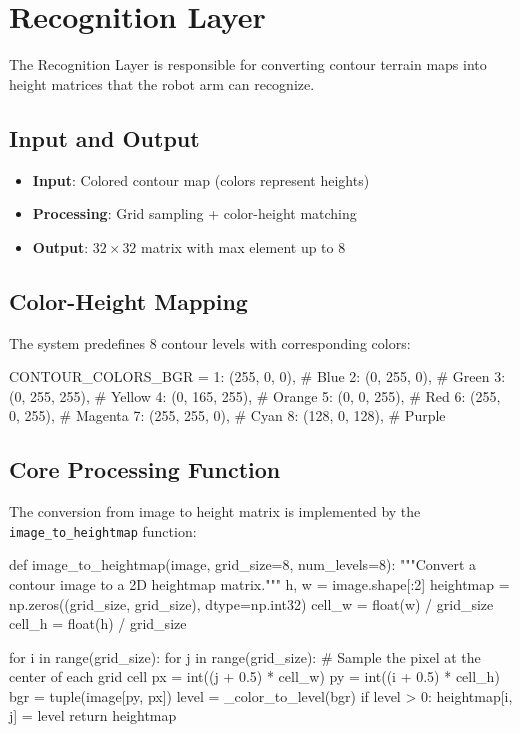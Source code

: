 \documentclass[12pt, a4paper]{article}
\begin{document}
\section{Recognition Layer}

The Recognition Layer is responsible for converting contour terrain maps into height matrices that the robot arm can recognize.

\subsection{Input and Output}

\begin{itemize}
    \item \textbf{Input}: Colored contour map (colors represent heights)
    \item \textbf{Processing}: Grid sampling + color-height matching
    \item \textbf{Output}: $32 \times 32$ matrix with max element up to 8
\end{itemize}

\subsection{Color-Height Mapping}

The system predefines 8 contour levels with corresponding colors:

\begin{pythoncode}
CONTOUR_COLORS_BGR = {
    1: (255, 0, 0),      # Blue
    2: (0, 255, 0),      # Green
    3: (0, 255, 255),    # Yellow
    4: (0, 165, 255),    # Orange
    5: (0, 0, 255),      # Red
    6: (255, 0, 255),    # Magenta
    7: (255, 255, 0),    # Cyan
    8: (128, 0, 128),    # Purple
}
\end{pythoncode}

\subsection{Core Processing Function}

The conversion from image to height matrix is implemented by the \texttt{image\_to\_heightmap} function:

\begin{pythoncode}
def image_to_heightmap(image, grid_size=8, num_levels=8):
    """Convert a contour image to a 2D heightmap matrix."""
    h, w = image.shape[:2]
    heightmap = np.zeros((grid_size, grid_size), dtype=np.int32)
    cell_w = float(w) / grid_size
    cell_h = float(h) / grid_size

    for i in range(grid_size):
        for j in range(grid_size):
            # Sample the pixel at the center of each grid cell
            px = int((j + 0.5) * cell_w)
            py = int((i + 0.5) * cell_h)
            bgr = tuple(image[py, px])
            level = _color_to_level(bgr)
            if level > 0:
                heightmap[i, j] = level
    return heightmap
\end{pythoncode}
\end{document}

